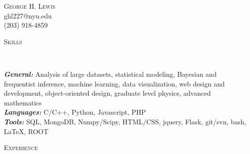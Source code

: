 \documentclass[9pt]{article}
\newenvironment{changemargin}[2]{%
  \begin{list}{}{%
    \setlength{\topsep}{0pt}%
    \setlength{\leftmargin}{#1}%
    \setlength{\rightmargin}{#2}%
    \setlength{\listparindent}{\parindent}%
    \setlength{\itemindent}{\parindent}%
    \setlength{\parsep}{\parskip}%
  }%
  \item[]}{\end{list}
}
\newcommand{\lineover}{
	\begin{changemargin}{-0.05in}{-0.05in}
		\vspace*{-8pt}
		\hrulefill \\
		\vspace*{-2pt}
	\end{changemargin}
}
\newcommand{\header}[1]{
	\begin{changemargin}{-0.5in}{-0.5in}
		\scshape{#1}\\
  	\lineover
	\end{changemargin}
}
\newcommand{\contact}[4]{
	\begin{changemargin}{-0.5in}{-0.5in}
		\begin{center}
			{\Large \scshape {#1}}\\ \smallskip
			{#2}\\ \smallskip 
			{#3}\\ \smallskip
			{#4}\smallskip
		\end{center}
	\end{changemargin}
}
\newenvironment{body} {
	\vspace*{-16pt}
	\begin{changemargin}{-0.25in}{-0.5in}
  }	
	{\end{changemargin}
}
\begin{document}
\contact{George H. Lewis}{ghl227@nyu.edu}{(203) 918-4859}
\smallskip

\smallskip

\header{Skills}
\begin{body}
	\vspace{14pt}
        \emph{\textbf{General:}}{} Analysis of large datasets, statistical modeling, Bayesian and frequentist inference, machine learning, data visualization, web design and development, object-oriented design, graduate level physics, advanced mathematics \\
        \smallskip
	\emph{\textbf{Languages:}}{} C/C++, Python, Javascript, PHP \\
        \smallskip
        \emph{\textbf{Tools:}}{} SQL, MongoDB, Numpy/Scipy, HTML/CSS, jquery, Flask, git/svn, bash, \LaTeX{}, ROOT \\
\end{body}

\smallskip

\header{Experience}
\end{document}
